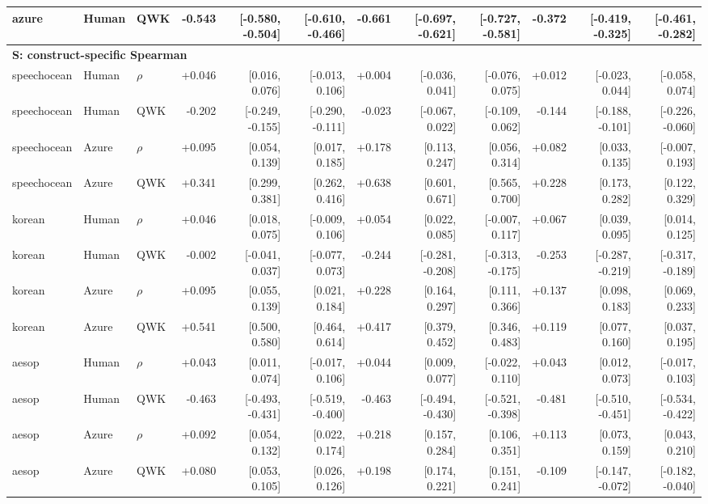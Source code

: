 \begin{landscape}
\begin{longtable}{@{}lllrrrrrrrrr@{}}
azure & Human & QWK & -0.543 & [-0.580, -0.504] & [-0.610, -0.466] & -0.661 & [-0.697, -0.621] & [-0.727, -0.581] & -0.372 & [-0.419, -0.325] & [-0.461, -0.282]\\
\midrule\multicolumn{12}{l}{\textbf{S: construct-specific Spearman}}\\*
speechocean & Human & $\rho$ & +0.046 & [0.016, 0.076] & [-0.013, 0.106] & +0.004 & [-0.036, 0.041] & [-0.076, 0.075] & +0.012 & [-0.023, 0.044] & [-0.058, 0.074]\\
speechocean & Human & QWK & -0.202 & [-0.249, -0.155] & [-0.290, -0.111] & -0.023 & [-0.067, 0.022] & [-0.109, 0.062] & -0.144 & [-0.188, -0.101] & [-0.226, -0.060]\\
speechocean & Azure & $\rho$ & +0.095 & [0.054, 0.139] & [0.017, 0.185] & +0.178 & [0.113, 0.247] & [0.056, 0.314] & +0.082 & [0.033, 0.135] & [-0.007, 0.193]\\
speechocean & Azure & QWK & +0.341 & [0.299, 0.381] & [0.262, 0.416] & +0.638 & [0.601, 0.671] & [0.565, 0.700] & +0.228 & [0.173, 0.282] & [0.122, 0.329]\\
\addlinespace[2pt]
korean & Human & $\rho$ & +0.046 & [0.018, 0.075] & [-0.009, 0.106] & +0.054 & [0.022, 0.085] & [-0.007, 0.117] & +0.067 & [0.039, 0.095] & [0.014, 0.125]\\
korean & Human & QWK & -0.002 & [-0.041, 0.037] & [-0.077, 0.073] & -0.244 & [-0.281, -0.208] & [-0.313, -0.175] & -0.253 & [-0.287, -0.219] & [-0.317, -0.189]\\
korean & Azure & $\rho$ & +0.095 & [0.055, 0.139] & [0.021, 0.184] & +0.228 & [0.164, 0.297] & [0.111, 0.366] & +0.137 & [0.098, 0.183] & [0.069, 0.233]\\
korean & Azure & QWK & +0.541 & [0.500, 0.580] & [0.464, 0.614] & +0.417 & [0.379, 0.452] & [0.346, 0.483] & +0.119 & [0.077, 0.160] & [0.037, 0.195]\\
\addlinespace[2pt]
aesop & Human & $\rho$ & +0.043 & [0.011, 0.074] & [-0.017, 0.106] & +0.044 & [0.009, 0.077] & [-0.022, 0.110] & +0.043 & [0.012, 0.073] & [-0.017, 0.103]\\
aesop & Human & QWK & -0.463 & [-0.493, -0.431] & [-0.519, -0.400] & -0.463 & [-0.494, -0.430] & [-0.521, -0.398] & -0.481 & [-0.510, -0.451] & [-0.534, -0.422]\\
aesop & Azure & $\rho$ & +0.092 & [0.054, 0.132] & [0.022, 0.174] & +0.218 & [0.157, 0.284] & [0.106, 0.351] & +0.113 & [0.073, 0.159] & [0.043, 0.210]\\
aesop & Azure & QWK & +0.080 & [0.053, 0.105] & [0.026, 0.126] & +0.198 & [0.174, 0.221] & [0.151, 0.241] & -0.109 & [-0.147, -0.072] & [-0.182, -0.040]\\

\end{longtable}
\end{landscape}
